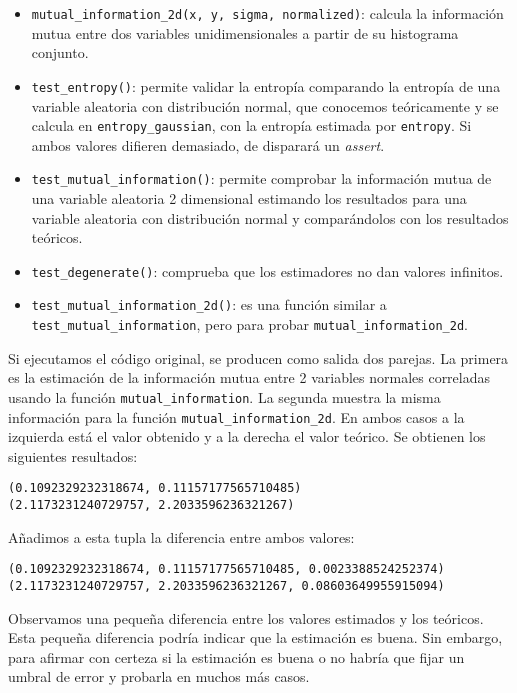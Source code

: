 \documentclass[12pt,a4paper]{report} %
\theoremstyle{definition}
\begin{document}
\begin{itemize}
\item \texttt{mutual\_information\_2d(x, y, sigma, normalized)}: calcula la información mutua entre dos variables unidimensionales a partir de su histograma conjunto. 

\item \texttt{test\_entropy()}: permite validar la entropía comparando la entropía de una variable aleatoria con distribución normal, que conocemos teóricamente y se calcula en \texttt{entropy\_gaussian}, con la entropía estimada por \texttt{entropy}. Si ambos valores difieren demasiado, de disparará un \textit{assert}.

\item \texttt{test\_mutual\_information()}: permite comprobar la información mutua de una variable aleatoria 2 dimensional estimando los resultados para una variable aleatoria con distribución normal y comparándolos con los resultados teóricos.

\item \texttt{test\_degenerate()}: comprueba que los estimadores no dan valores infinitos.

\item \texttt{test\_mutual\_information\_2d()}: es una función similar a \texttt{test\_mutual\_information}, pero para probar \texttt{mutual\_information\_2d}.
\end{itemize} 

Si ejecutamos el código original, se producen como salida dos parejas. La primera es la estimación de la información mutua entre 2 variables normales correladas usando la función \texttt{mutual\_information}. La segunda muestra la misma información para la función \texttt{mutual\_information\_2d}. En ambos casos a la izquierda está el valor obtenido y a la derecha el valor teórico. Se obtienen los siguientes resultados:
\begin{lstlisting}
(0.1092329232318674, 0.11157177565710485)
(2.1173231240729757, 2.2033596236321267)
\end{lstlisting}

Añadimos a esta tupla la diferencia entre ambos valores:
\begin{lstlisting}
(0.1092329232318674, 0.11157177565710485, 0.0023388524252374)
(2.1173231240729757, 2.2033596236321267, 0.08603649955915094)
\end{lstlisting}

Observamos una pequeña diferencia entre los valores estimados y los teóricos. Esta pequeña diferencia podría indicar que la estimación es buena. Sin embargo, para afirmar con certeza si la estimación es buena o no habría que fijar un umbral de error y probarla en muchos más casos.\\ 
\end{document}
